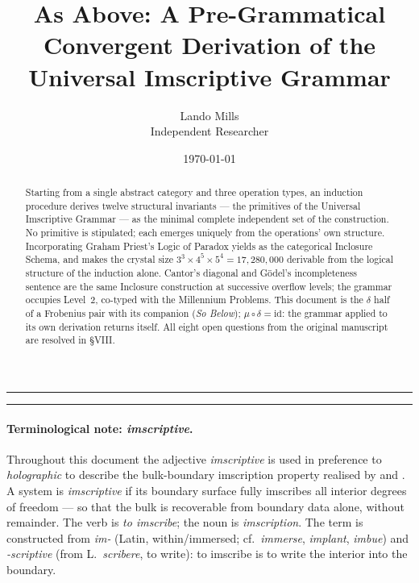 \documentclass[12pt,a4paper]{article}
\begin{document}
\title{As Above: A Pre-Grammatical Convergent Derivation of the Universal Imscriptive Grammar}
\author{Lando Mills \\ \normalsize Independent Researcher}
\date{\today}

\maketitle

\begin{center}
\rule{0.5\textwidth}{0.4pt}
\end{center}

\begin{abstract}
Starting from a single abstract category and three operation types, an induction procedure derives twelve structural invariants --- the primitives of the Universal Imscriptive Grammar --- as the minimal complete independent set of the construction. No primitive is stipulated; each emerges uniquely from the operations' own structure. Incorporating Graham Priest's Logic of Paradox yields  as the categorical Inclosure Schema, and makes the crystal size $3^3 \times 4^5 \times 5^4 = 17{,}280{,}000$ derivable from the logical structure of the induction alone. Cantor's diagonal and G\"odel's incompleteness sentence are the same Inclosure construction at successive overflow levels; the grammar occupies Level~2, co-typed with the Millennium Problems. This document is the $\delta$ half of a Frobenius pair with its companion (\emph{So Below}); $\mu \circ \delta = \text{id}$: the grammar applied to its own derivation returns itself. All eight open questions from the original manuscript are resolved in \S VIII.
\end{abstract}\begin{center}
\rule{0.5\textwidth}{0.4pt}
\end{center}

\paragraph*{Terminological note: \emph{imscriptive}.}
Throughout this document the adjective \emph{imscriptive} is used in preference to \emph{holographic} to describe the bulk-boundary imscription property realised by  and . A system is \emph{imscriptive} if its boundary surface fully imscribes all interior degrees of freedom --- so that the bulk is recoverable from boundary data alone, without remainder. The verb is \emph{to imscribe}; the noun is \emph{imscription}. The term is constructed from \emph{im-} (Latin, within/immersed; cf.\ \emph{immerse}, \emph{implant}, \emph{imbue}) and \emph{-scriptive} (from L.\ \emph{scribere}, to write): to imscribe is to write the interior into the boundary.
\end{document}
